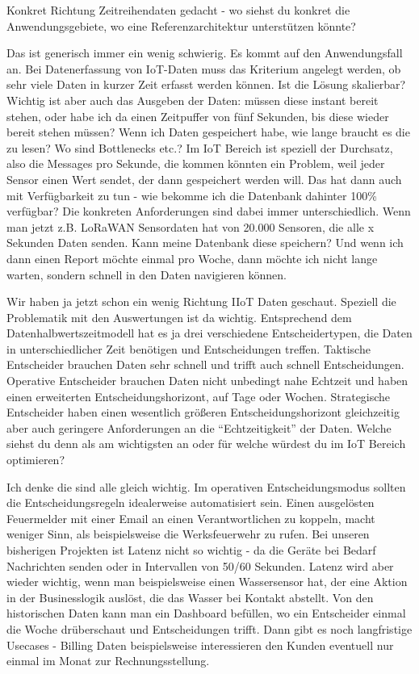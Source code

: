 \LF Konkret Richtung Zeitreihendaten gedacht - wo siehst du konkret die Anwendungsgebiete, wo eine Referenzarchitektur unterstützen könnte?

\RB Das ist generisch immer ein wenig schwierig. Es kommt auf den Anwendungsfall an. Bei Datenerfassung von \ac{IoT}-Daten muss das Kriterium angelegt werden, ob sehr viele Daten in kurzer Zeit erfasst werden können. Ist die Lösung skalierbar? Wichtig ist aber auch das Ausgeben der Daten: müssen diese instant bereit stehen, oder habe ich da einen Zeitpuffer von fünf Sekunden, bis diese wieder bereit stehen müssen? Wenn ich Daten gespeichert habe, wie lange braucht es die zu lesen? Wo sind Bottlenecks etc.? Im \ac{IoT} Bereich ist speziell der Durchsatz, also die Messages pro Sekunde, die kommen könnten ein Problem, weil jeder Sensor einen Wert sendet, der dann gespeichert werden will. Das hat dann auch mit Verfügbarkeit zu tun - wie bekomme ich die Datenbank dahinter 100\% verfügbar? Die konkreten Anforderungen sind dabei immer unterschiedlich. Wenn man jetzt z.B. \ac{LoRaWAN} Sensordaten hat von 20.000 Sensoren, die alle x Sekunden Daten senden. Kann meine Datenbank diese speichern? Und wenn ich dann einen Report möchte einmal pro Woche, dann möchte ich nicht lange warten, sondern schnell in den Daten navigieren können.

\LF Wir haben ja jetzt schon ein wenig Richtung \ac{IIoT} Daten geschaut. Speziell die Problematik mit den Auswertungen ist da wichtig. Entsprechend dem Datenhalbwertszeitmodell hat es ja drei verschiedene Entscheidertypen, die Daten in unterschiedlicher Zeit benötigen und Entscheidungen treffen. Taktische Entscheider brauchen Daten sehr schnell und trifft auch schnell Entscheidungen. Operative Entscheider brauchen Daten nicht unbedingt nahe Echtzeit und haben einen erweiterten Entscheidungshorizont, auf Tage oder Wochen. Strategische Entscheider haben einen wesentlich größeren Entscheidungshorizont gleichzeitig aber auch geringere Anforderungen an die \enquote{Echtzeitigkeit} der Daten. Welche siehst du denn als am wichtigsten an oder für welche würdest du im \ac{IoT} Bereich optimieren?

\RB Ich denke die sind alle gleich wichtig. Im operativen Entscheidungsmodus sollten die Entscheidungsregeln idealerweise automatisiert sein. Einen ausgelösten Feuermelder mit einer Email an einen Verantwortlichen zu koppeln, macht weniger Sinn, als beispielsweise die Werksfeuerwehr zu rufen. Bei unseren bisherigen Projekten ist Latenz nicht so wichtig - da die Geräte bei Bedarf Nachrichten senden oder in Intervallen von 50/60 Sekunden. Latenz wird aber wieder wichtig, wenn man beispielsweise einen Wassersensor hat, der eine Aktion in der Businesslogik auslöst, die das Wasser bei Kontakt abstellt. Von den historischen Daten kann man ein Dashboard befüllen, wo ein Entscheider einmal die Woche drüberschaut und Entscheidungen trifft. Dann gibt es noch langfristige Usecases - Billing Daten beispielsweise interessieren den Kunden eventuell nur einmal im Monat zur Rechnungsstellung.

